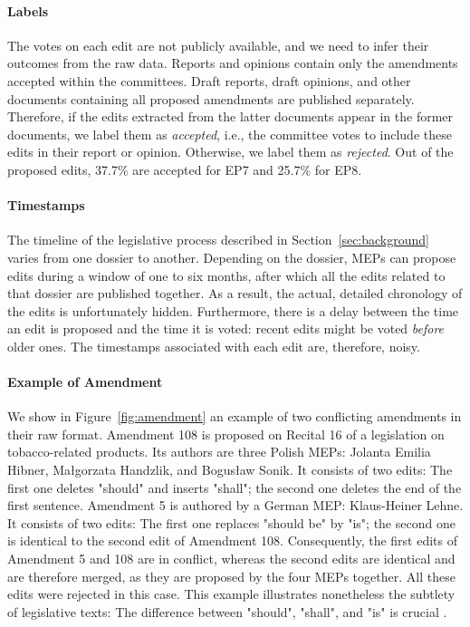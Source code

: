 \paragraph{Labels}
The votes on each edit are not publicly available, and we need to infer their outcomes from the raw data.
Reports and opinions contain only the amendments accepted within the committees.
Draft reports, draft opinions, and other documents containing all proposed amendments are published separately.
Therefore, if the edits extracted from the latter documents  appear in the former documents, we label them as \textit{accepted}, i.e., the committee votes to include these edits in their report or opinion.
Otherwise, we label them as \textit{rejected}.
Out of the proposed edits, 37.7\% are accepted for EP7 and 25.7\% for EP8.

\paragraph{Timestamps}
The timeline of the legislative process described in Section~\ref{sec:background} varies from one dossier to another.
Depending on the dossier, MEPs can propose edits during a window of one to six months, after which all the edits related to that dossier are published together.
As a result, the actual, detailed chronology of the edits is unfortunately hidden.
Furthermore, there is a delay between the time an edit is proposed and the time it is voted: recent edits might be voted \textit{before} older ones.
The timestamps associated with each edit are, therefore, noisy.

\paragraph{Example of Amendment}
We show in Figure~\ref{fig:amendment} an example of two conflicting amendments in their raw format.
Amendment 108 is proposed on Recital 16 of a legislation on tobacco-related products.
Its authors are three Polish MEPs: Jolanta Emilia Hibner, Małgorzata Handzlik, and Bogusław Sonik.
It consists of two edits:
The first one deletes "should" and inserts "shall"; the second one deletes the end of the first sentence.
Amendment 5 is authored by a German MEP: Klaus-Heiner Lehne.
It consists of two edits:
The first one replaces "should be" by "is"; the second one is identical to the second edit of Amendment 108.
Consequently, the first edits of Amendment 5 and 108 are in conflict, whereas the second edits are identical and are therefore merged, as they are proposed by the four MEPs together.
All these edits were rejected in this case.
This example illustrates nonetheless the subtlety of legislative texts: The difference between "should", "shall", and "is" is crucial \cite{guardian2015typo}.

